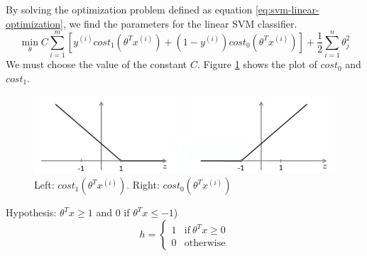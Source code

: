 By solving the optimization problem defined as equation \ref{eq:svm-linear-optimization}, we find the parameters for the linear SVM classifier.
\begin{equation}
\min_{\theta}C \sum_{i=1}^{m}
\left[ y^{(i)}cost_1(\theta^Tx^{(i)})+(1-y^{(i)})cost_0(\theta^Tx^{(i)}) \right]
+ \frac{1}{2}\sum_{i=1}^{n}\theta^2_j
\label{eq:svm-linear-optimization}
\end{equation}
We must choose the value of the constant $C$. 
Figure \ref{fig:svm-cost-function} shows the plot of $cost_0$ and $cost_1$.
\begin{figure}[H]
\centering
\includegraphics[scale=.75]{billeder/svm-cost-function}
\caption{Left: $cost_1(\theta^Tx^{(i)})$. Right: $cost_0(\theta^Tx^{(i)})$}
\label{fig:svm-cost-function}
\end{figure}

Hypothesis:  $\theta^Tx \geq 1$ and 0 if $\theta^Tx \leq -1$)
\begin{equation}
h = 
\begin{cases}
1 & \text{if}\ \theta^Tx \geq 0 \\
0 & \text{otherwise}
\end{cases}
\end{equation}


